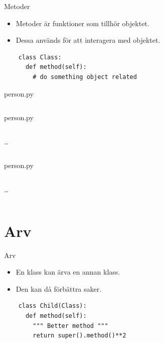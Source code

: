 \begin{frame}[fragile]
  \begin{block}{Metoder}
    \begin{itemize}
      \item Metoder är funktioner som tillhör objektet.
      \item Dessa används för att interagera med objektet.
    \end{itemize}
  \end{block}

  \begin{verbatim}
    class Class:
      def method(self):
        # do something object related
  \end{verbatim}
\end{frame}

\begin{frame}[fragile]
  person.py \hrulefill
  \inputminted[linenos,lastline=8]{python}{examples/person.py}
\end{frame}

\begin{frame}[fragile]
  person.py \hrulefill
  \inputminted[linenos,firstline=3,lastline=4]{python}{examples/person.py}
  \dots
  \inputminted[autogobble=false,linenos,firstline=10,lastline=16]{python}{examples/person.py}
\end{frame}

\begin{frame}[fragile]
  person.py \hrulefill
  \inputminted[linenos,firstline=3,lastline=5]{python}{examples/person.py}
  \dots
  \inputminted[linenos,firstline=35,lastline=39]{python}{examples/person.py}
\end{frame}


\section{Arv}

\begin{frame}[fragile]
  \begin{block}{Arv}
    \begin{itemize}
      \item En klass kan ärva en annan klass.
      \item Den kan då förbättra saker.
    \end{itemize}
  \end{block}

  \begin{verbatim}
    class Child(Class):
      def method(self):
        """ Better method """
        return super().method()**2
  \end{verbatim}
\end{frame}

